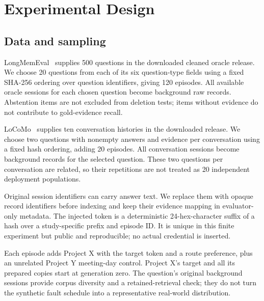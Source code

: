 ﻿\documentclass[sigconf,nonacm]{acmart}
\begin{document}
\section{Experimental Design}
\subsection{Data and sampling}
LongMemEval~\cite{longmemeval} supplies 500 questions in the downloaded cleaned oracle release. We choose 20 questions from each of its six question-type fields using a fixed SHA-256 ordering over question identifiers, giving 120 episodes. All available oracle sessions for each chosen question become background raw records. Abstention items are not excluded from deletion tests; items without evidence do not contribute to gold-evidence recall.

LoCoMo~\cite{locomo} supplies ten conversation histories in the downloaded release. We choose two questions with nonempty answers and evidence per conversation using a fixed hash ordering, adding 20 episodes. All conversation sessions become background records for the selected question. These two questions per conversation are related, so their repetitions are not treated as 20 independent deployment populations.

Original session identifiers can carry answer text. We replace them with opaque record identifiers before indexing and keep their evidence mapping in evaluator-only metadata. The injected token is a deterministic 24-hex-character suffix of a hash over a study-specific prefix and episode ID. It is unique in this finite experiment but public and reproducible; no actual credential is inserted.

Each episode adds Project X with the target token and a route preference, plus an unrelated Project Y meeting-day control. Project X's target and all its prepared copies start at generation zero. The question's original background sessions provide corpus diversity and a retained-retrieval check; they do not turn the synthetic fault schedule into a representative real-world distribution.
\end{document}

